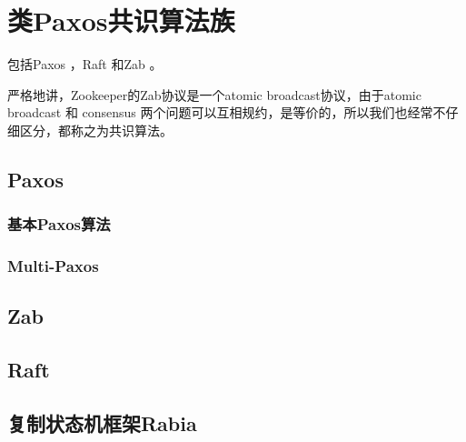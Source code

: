 \chapter{类Paxos共识算法族}


包括Paxos \cite{Lamport01}，Raft \cite{Ongaro14}和Zab \cite{Hunt10, Junqueira11}。

严格地讲，Zookeeper的Zab协议是一个atomic broadcast协议，由于atomic broadcast 和 consensus 两个问题可以互相规约，是等价的\cite{Chandra96unreliable}，所以我们也经常不仔细区分，都称之为共识算法。

\section{Paxos} \label{}

\subsection{基本Paxos算法}

\subsection{Multi-Paxos}

\section{Zab} \label{}


\section{Raft} \label{}


\section{复制状态机框架Rabia} \label{Sec_Rabia}

